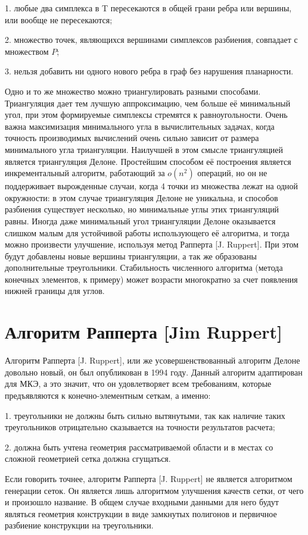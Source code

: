 \documentclass[14pt]{extreport}
\begin{document}
	1. любые два симплекса в T пересекаются в общей грани ребра или вершины, или вообще не пересекаются;

	2. множество точек, являющихся вершинами симплексов разбиения, совпадает с множеством $P$;
	
	3. нельзя добавить ни одного нового ребра в граф без нарушения планарности.

Одно и то же множество можно триангулировать разными способами. Триангуляция дает тем лучшую аппроксимацию, чем больше её минимальный угол, при этом формируемые симплексы стремятся к равноугольности. Очень важна максимизация минимального угла в вычислительных задачах, когда точность производимых вычислений очень сильно зависит от размера минимального угла триангуляции. Наилучшей в этом смысле триангуляцией является триангуляция Делоне. Простейшим способом её построения является инкрементальный алгоритм, работающий за $o(n^2)$ операций, но он не поддерживает вырожденные случаи, когда 4 точки из множества лежат на одной окружности: в этом случае триангуляция Делоне не уникальна, и способов разбиения существует несколько, но минимальные углы этих триангуляций равны. Иногда даже минимальный угол триангуляции Делоне оказывается слишком малым для устойчивой работы использующего её алгоритма, и тогда можно произвести улучшение, используя метод Рапперта [J. Ruppert]. При этом будут добавлены новые вершины триангуляции, а так же образованы дополнительные треугольники. Стабильность численного алгоритма (метода конечных элементов, к примеру) может возрасти многократно за счет появления нижней границы для углов. 

\section{Алгоритм Рапперта [Jim Ruppert]}

Алгоритм Рапперта [J. Ruppert], или же усовершенствованный алгоритм Делоне довольно новый, он был опубликован в 1994 году. Данный алгоритм адаптирован для МКЭ, а это значит, что он удовлетворяет всем требованиям, которые предъявляются к конечно-элементным сеткам, а именно:

1. треугольники не должны быть сильно вытянутыми, так как наличие таких треугольников отрицательно сказывается на точности результатов расчета;

2. должна быть учтена геометрия рассматриваемой области и в местах со сложной геометрией сетка должна сгущаться.


Если говорить точнее, алгоритм Рапперта [J. Ruppert] не является алгоритмом генерации сеток. Он является лишь алгоритмом улучшения качеств сетки, от чего и произошло название. В общем случае входными данными для него будут являться геометрия конструкции в виде замкнутых полигонов и первичное разбиение конструкции на треугольники. 
\end{document}
